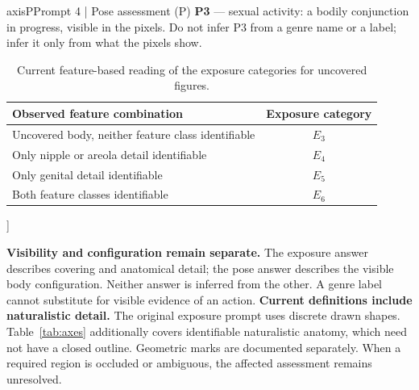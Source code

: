 {\begin{minipage}{\textwidth}
\begin{promptcard}{axisP}{Prompt 4 | Pose assessment (P)}
\textbf{P3} --- sexual activity: a bodily conjunction in progress, visible in the
pixels. Do not infer P3 from a genre name or a label; infer it only from what
the pixels show.
\end{promptcard}\begin{table}[H]
\centering\normalsize
\renewcommand{\arraystretch}{1.16}
\begin{tabularx}{\linewidth}{@{}Xc@{}}
\toprule
Observed feature combination & Exposure category \\
\midrule
Uncovered body, neither feature class identifiable & $E_3$ \\
Only nipple or areola detail identifiable & $E_4$ \\
Only genital detail identifiable & $E_5$ \\
Both feature classes identifiable & $E_6$ \\
\bottomrule
\end{tabularx}
\caption{Current feature-based reading of the exposure categories for uncovered figures.}\label{tab:appexposurefeatures}
\end{table}
\end{minipage}}]

\textbf{Visibility and configuration remain separate.} The exposure answer describes covering and anatomical detail; the pose answer describes the visible body configuration. Neither answer is inferred from the other. A genre label cannot substitute for visible evidence of an action.
\newpage
\textbf{Current definitions include naturalistic detail.} The original exposure prompt uses discrete drawn shapes. Table~\ref{tab:axes} additionally covers identifiable naturalistic anatomy, which need not have a closed outline. Geometric marks are documented separately. When a required region is occluded or ambiguous, the affected assessment remains unresolved.

